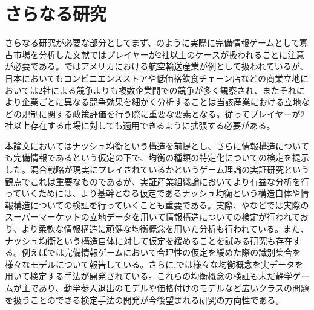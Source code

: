 \section{さらなる研究}
さらなる研究が必要な部分としてまず、\cite{Ciliberto2009a}のように実際に完備情報ゲームとして寡占市場を分析した文献ではプレイヤーが$2$社以上のケースが扱われることに注意が必要である。\cite{Ciliberto2009a}ではアメリカにおける航空輸送産業が例として扱われているが、日本においてもコンビニエンスストアや低価格飲食チェーン店などの商業立地においては$2$社による競争よりも複数企業間での競争が多く観察され、またそれにより企業ごとに異なる競争効果を細かく分析することは当該産業における立地などの規制に関する政策評価を行う際に重要な要素となる。従ってプレイヤーが$2$社以上存在する市場に対しても適用できるように拡張する必要がある。

本論文においてはナッシュ均衡という構造を前提とし、さらに情報構造についても完備情報であるという仮定の下で、均衡の種類の特定化についての検定を提示した。混合戦略が現実にプレイされているかというゲーム理論の実証研究という観点でこれは重要なものであるが、実証産業組織論においてより有益な分析を行っていくためには、より基幹となる仮定であるナッシュ均衡という構造自体や情報構造についての検証を行っていくことも重要である。実際、\cite{Grieco2014a}や\cite{Magnolfi2015}などでは実際のスーパーマーケットの立地データを用いて情報構造についての検定が行われており、より柔軟な情報構造に頑健な均衡概念を用いた分析も行われている。また、ナッシュ均衡という構造自体に対して仮定を緩めることを試みる研究も存在する。例えば\cite{Aradillas-Lopez2008}では完備情報ゲームにおいて合理性の仮定を緩めた際の識別集合を様々なモデルについて報告している。さらに\cite{Kashaev2017},\cite{Kashaev2016}では様々な均衡概念を実データを用いて検定する手法が開発されている。これらの均衡概念の検証も未だ静学ゲームが主であり、動学参入退出のモデルや価格付けのモデルなど広いクラスの問題を扱うことのできる検定手法の開発が今後望まれる研究の方向性である。
